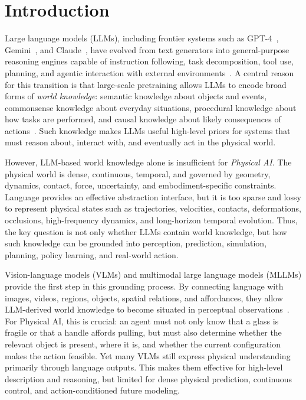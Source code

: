 \section{Introduction}

Large language models (LLMs), including frontier systems such as GPT-4~\cite{openai2023gpt4}, Gemini~\cite{team2023gemini}, and Claude~\cite{anthropic2024claude35sonnettool}, have evolved from text generators into general-purpose reasoning engines capable of instruction following, task decomposition, tool use, planning, and agentic interaction with external environments~\citep{brown2020language,wei2022chain}. 
A central reason for this transition is that large-scale pretraining allows LLMs to encode broad forms of \emph{world knowledge}: semantic knowledge about objects and events, commonsense knowledge about everyday situations, procedural knowledge about how tasks are performed, and causal knowledge about likely consequences of actions~\citep{petroni2019language,roberts2020knowledge,kandpal2023longtail,chang2024factualpretraining}. 
Such knowledge makes LLMs useful high-level priors for systems that must reason about, interact with, and eventually act in the physical world.

However, LLM-based world knowledge alone is insufficient for \emph{Physical AI}. 
The physical world is dense, continuous, temporal, and governed by geometry, dynamics, contact, force, uncertainty, and embodiment-specific constraints. 
Language provides an effective abstraction interface, but it is too sparse and lossy to represent physical states such as trajectories, velocities, contacts, deformations, occlusions, high-frequency dynamics, and long-horizon temporal evolution. 
Thus, the key question is not only whether LLMs contain world knowledge, but how such knowledge can be grounded into perception, prediction, simulation, planning, policy learning, and real-world action.

Vision-language models (VLMs) and multimodal large language models (MLLMs) provide the first step in this grounding process. 
By connecting language with images, videos, regions, objects, spatial relations, and affordances, they allow LLM-derived world knowledge to become situated in perceptual observations~\citep{alayrac2022flamingo,li2023blip,liu2023llava,team2023gemini}. 
For Physical AI, this is crucial: an agent must not only know that a glass is fragile or that a handle affords pulling, but must also determine whether the relevant object is present, where it is, and whether the current configuration makes the action feasible. 
Yet many VLMs still express physical understanding primarily through language outputs. 
This makes them effective for high-level description and reasoning, but limited for dense physical prediction, continuous control, and action-conditioned future modeling.

